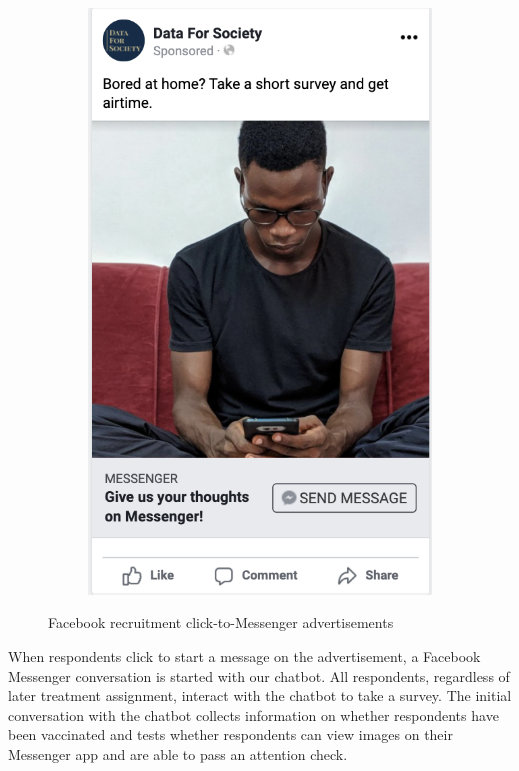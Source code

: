 \documentclass[letterpaper, 12pt, parskip=full,DIV=10]{scrartcl}
\begin{document}
\begin{enumerate}
\begin{figure}[h!]
\begin{subfigure}{0.45\textwidth}
  \label{fig:ad1}
\end{subfigure}
\begin{subfigure}{0.45\textwidth}
  \centering
  \includegraphics[width = \textwidth]{../../tables-figures/ad2.png} 
  \label{fig:ad2}
\end{subfigure}
   \caption{Facebook recruitment click-to-Messenger advertisements}
   \label{fig:ads}
\end{figure}

When respondents click to start a message on the advertisement, a Facebook Messenger conversation is started with our chatbot. All respondents, regardless of later treatment assignment, interact with the chatbot to take a survey. The initial conversation with the chatbot collects information on whether respondents have been vaccinated and tests whether respondents can view images on their Messenger app and are able to pass an attention check. 


\end{enumerate}
\end{document}
